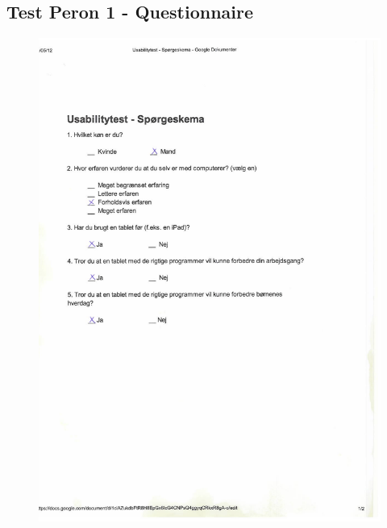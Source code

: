 \subsection*{Test Peron 1 - Questionnaire}
\begin{figure}[H]
	\centering
		\includegraphics[width=\textwidth]{Appendix/demo_d1.pdf}
	\label{fig:demo_t}
\end{figure}

